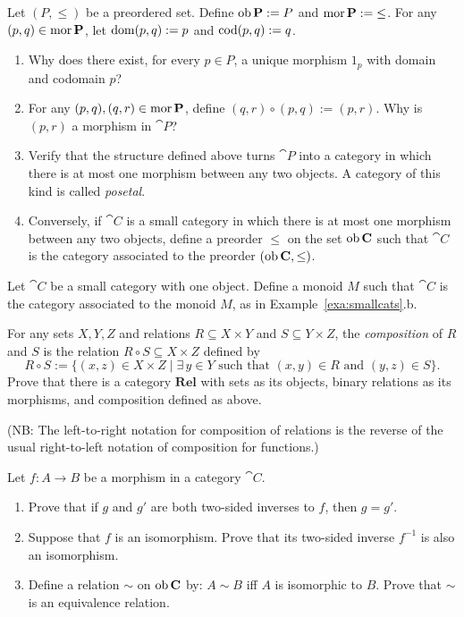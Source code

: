\exercises
\begin{exercise}\label{exe:preordercategory}
Let $(P,\leq)$ be a preordered set. Define $\operatorname{\mathrm{ob}} \mathbf{P} := P$ and $\operatorname{\mathrm{mor}} \mathbf{P} := {\leq}$. For any $(p,q) \in \operatorname{\mathrm{mor}} \mathbf{P}$, let $\operatorname{\mathrm{dom}} (p,q) := p$ and $\operatorname{\mathrm{cod}} (p,q) := q$.
\begin{enumerate}
\item Why does there exist, for every $p \in P$, a unique morphism $1_p$ with domain and codomain $p$?
\item For any $(p,q), (q,r) \in \operatorname{\mathrm{mor}} \mathbf{P}$, define $(q,r) \circ (p,q) := (p,r)$. Why is $(p,r)$ a morphism in $\cat{P}$?
\item Verify that the structure defined above turns $\cat{P}$ into a category in which there is at most one morphism between any two objects. A category of this kind is called \emph{posetal}.
\item Conversely, if $\cat{C}$ is a small category in which there is at most one morphism between any two objects, define a preorder $\leq$ on the set $\operatorname{\mathrm{ob}} \mathbf{C}$ such that $\cat{C}$ is the category associated to the preorder $(\operatorname{\mathrm{ob}} \mathbf{C}, \leq)$.
\end{enumerate}
\end{exercise}

\begin{exercise}\label{exe:categorymonoid}
Let $\cat{C}$ be a small category with one object. Define a monoid $M$ such that $\cat{C}$ is the category associated to the monoid $M$, as in Example~\ref{exa:smallcats}.b.
\end{exercise}

\begin{exercise}\label{exe:catofrels}
For any sets $X, Y, Z$ and relations $R \subseteq X \times Y$ and $S \subseteq Y \times Z$, the \emph{composition} of $R$ and $S$ is the relation $R \circ S \subseteq X \times Z$ defined by 
\[ R \circ S := \{(x,z) \in X \times Z\mid\exists\, y \in Y \text{ such that } (x,y) \in R \text{ and } (y,z) \in S\}.\]
Prove that there is a category $\mathbf{Rel}$ with sets as its objects, binary relations as its morphisms, and composition defined as above.

(NB: The left-to-right notation for composition of relations is the reverse of the usual right-to-left notation of composition for functions.)
\end{exercise}


\begin{exercise}\label{exe:inverseunique}
Let $f \colon A \to B$ be a morphism in a category $\cat{C}$. 
\begin{enumerate}
\item Prove that if $g$ and $g'$ are both two-sided inverses to $f$, then $g = g'$.
\item Suppose that $f$ is an isomorphism. Prove that its two-sided inverse $f^{-1}$ is also an isomorphism.
\item Define a relation ${\sim}$ on $\operatorname{\mathrm{ob}} \mathbf{C}$ by: $A \sim B$ iff $A$ is isomorphic to $B$. Prove that ${\sim}$ is an equivalence relation.
\end{enumerate}
\end{exercise}


